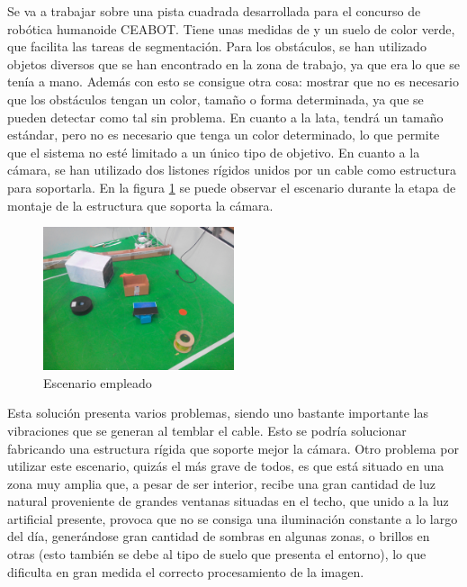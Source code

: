 Se va a trabajar sobre una pista cuadrada desarrollada para el concurso de robótica humanoide CEABOT. Tiene unas medidas de  y un suelo de color verde, que facilita las tareas de segmentación. Para los obstáculos, se han utilizado objetos diversos que se han encontrado en la zona de trabajo, ya que era lo que se tenía a mano. Además con esto se consigue otra cosa: mostrar que no es necesario que los obstáculos tengan un color, tamaño o forma determinada, ya que se pueden detectar como tal sin problema. En cuanto a la lata, tendrá un tamaño estándar, pero no es necesario que tenga un color determinado, lo que permite que el sistema no esté limitado a un único tipo de objetivo. En cuanto a la cámara, se han utilizado dos listones rígidos unidos por un cable como estructura para soportarla. En la figura \ref{fig:escenario} se puede observar el escenario durante la etapa de montaje de la estructura que soporta la cámara.\\

\begin{figure}[H]
        \centering
        \includegraphics[width=0.5\textwidth]{images/environment_without_david.jpg}
        \caption{Escenario empleado}
        \label{fig:escenario}
\end{figure} 

Esta solución presenta varios problemas, siendo uno bastante importante las vibraciones que se generan al temblar el cable. Esto se podría solucionar fabricando una estructura rígida que soporte mejor la cámara. Otro problema por utilizar este escenario, quizás el más grave de todos, es que está situado en una zona muy amplia que, a pesar de ser interior, recibe una gran cantidad de luz natural proveniente de grandes ventanas situadas en el techo, que unido a la luz artificial presente, provoca que no se consiga una iluminación constante a lo largo del día, generándose gran cantidad de sombras en algunas zonas, o brillos en otras (esto también se debe al tipo de suelo que presenta el entorno), lo que dificulta en gran medida el correcto procesamiento de la imagen.\\  